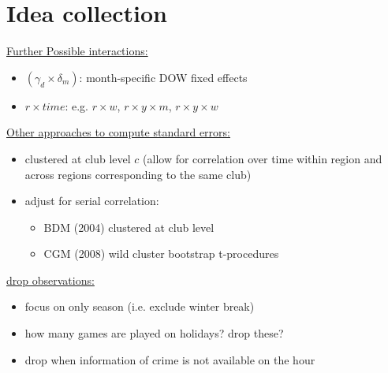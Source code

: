 \documentclass[11pt, a4paper]{article} %
\begin{document}

\newpage
\section*{Idea collection}
\underline{Further Possible interactions:} 
\begin{itemize}
	\item $(\gamma_d \times \delta_m)$: month-specific DOW fixed effects
	\item $r \times time$: e.g. $r \times w$, $r \times y \times m$,  $r \times y \times w$
\end{itemize}

\underline{Other approaches to compute standard errors:}
\begin{itemize}
	\item clustered at club level $c$ (allow for correlation over time within region and across regions corresponding to the same club)

	\item adjust for serial correlation: 
	\begin{itemize}
		\item BDM (2004) clustered at club level
		\item CGM (2008) wild cluster bootstrap t-procedures
	\end{itemize}
\end{itemize}

\underline{drop observations:}
\begin{itemize}
	\item focus on only season (i.e. exclude winter break)
	\item how many games are played on holidays? drop these? 
	\item drop when information of crime is not available on the hour
\end{itemize}
\end{document}
